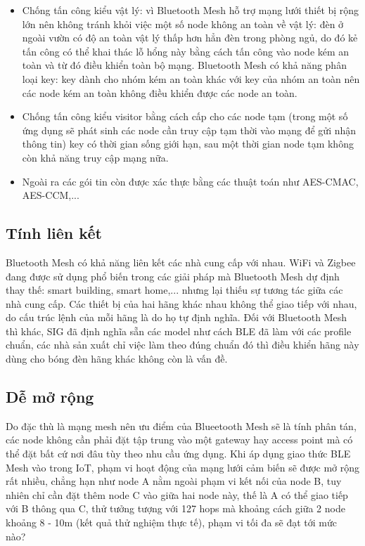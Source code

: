 \begin{itemize}
                \item Chống tấn công kiểu vật lý: vì Bluetooth Mesh hỗ trợ mạng lưới thiết bị rộng lớn nên không tránh khỏi việc một số node không an toàn về vật lý: đèn ở ngoài vườn có độ an toàn vật lý thấp hơn hẳn đèn trong phòng ngủ, do đó kẻ tấn công có thể khai thác lỗ hổng này bằng cách tấn công vào node kém an toàn và từ đó điều khiển toàn bộ mạng. Bluetooth Mesh có khả năng phân loại key: key dành cho nhóm kém an toàn khác với key của nhóm an toàn nên các node kém an toàn không điều khiển được các node an toàn.
                \item Chống tấn công kiểu visitor bằng cách cấp cho các node tạm (trong một số ứng dụng sẽ phát sinh các node cần truy cập tạm thời vào mạng để gửi nhận thông tin) key có thời gian sống giới hạn, sau một thời gian node tạm không còn khả năng truy cập mạng nữa.
                \item Ngoài ra các gói tin còn được xác thực bằng các thuật toán như AES-CMAC, AES-CCM,...
            \end{itemize}
        \subsection{Tính liên kết}
        Bluetooth Mesh có khả năng liên kết các nhà cung cấp với nhau. WiFi và Zigbee đang được sử dụng phổ biến trong các giải pháp mà Bluetooth Mesh dự định thay thế: smart building, smart home,... nhưng lại thiếu sự tương tác giữa các nhà cung cấp. Các thiết bị của hai hãng khác nhau không thể giao tiếp với nhau, do cấu trúc lệnh của mỗi hãng là do họ tự định nghĩa. Đối với Bluetooth Mesh thì khác, SIG đã định nghĩa sẵn các model như cách BLE đã làm với các profile chuẩn, các nhà sản xuất chỉ việc làm theo đúng chuẩn đó thì điều khiển hãng này dùng cho bóng đèn hãng khác không còn là vấn đề.
        \subsection{Dễ mở rộng}
        Do đặc thù là mạng mesh nên ưu điểm của Blueetooth Mesh sẽ là tính phân tán, các node không cần phải đặt tập trung vào một gateway hay access point mà có thể đặt bất cứ nơi đâu tùy theo nhu cầu ứng dụng. Khi áp dụng giao thức BLE Mesh vào trong IoT, phạm vi hoạt động của mạng lưới cảm biến sẽ được mở rộng rất nhiều, chẳng hạn như node A nằm ngoài phạm vi kết nối của node B, tuy nhiên chỉ cần đặt thêm node C vào giữa hai node này, thế là A có thể giao tiếp với B thông qua C, thử tưởng tượng với 127 hops mà khoảng cách giữa 2 node khoảng 8 - 10m (kết quả thử nghiệm thực tế), phạm vi tối đa sẽ đạt tới mức nào? 
